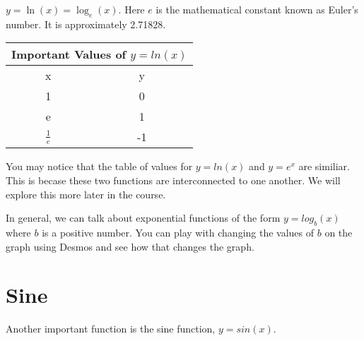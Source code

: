 \documentclass{ximera}
\begin{document}
\begin{example}
$y=\ln(x)=\log_e(x)$.  Here $e$ is the mathematical constant known as Euler's number.  It is approximately 2.71828.


\begin{tabular}{ |c || c|  }
 \hline
 \multicolumn{2}{|c|}{Important Values of $y=ln(x)$} \\
\hline
 \hline
 x & y\\
 \hline
 1&0\\
 e&1\\
 $\frac{1}{e}$&-1\\
 \hline
\end{tabular}

You may notice that the table of values for $y=ln(x)$ and $y=e^x$ are similiar.  This is becase these two functions are interconnected to one another.  We will explore this more later in the course.

\end{example}

In general, we can talk about exponential functions of the form $y=log_b(x)$ where $b$ is a positive number.  You can play with changing the values of $b$ on the graph using Desmos and see how that changes the graph.  

\begin{center}  
\end{center}


\section{Sine}
Another important function is the sine function, $y=sin(x)$. 
\end{document}
